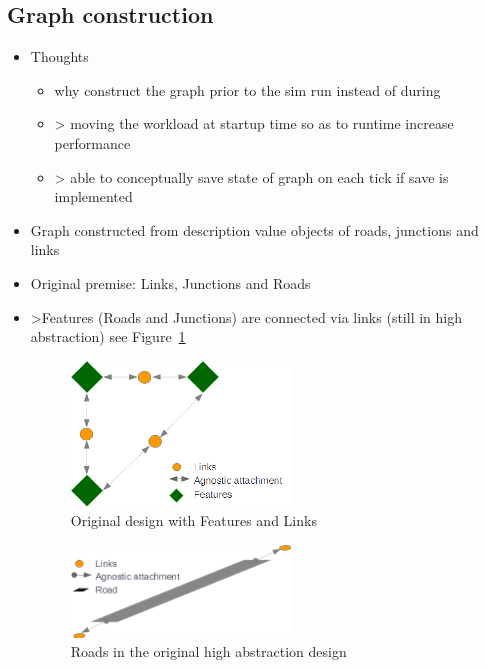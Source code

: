 \subsection{Graph construction}

\begin{itemize}
	\item Thoughts
	\begin{itemize}
		\item why construct the graph prior to the sim run instead of during	
		\item > moving the workload at startup time so as to runtime increase performance
		\item > able to conceptually save state of graph on each tick if save is implemented
	\end{itemize}
	\item Graph constructed from description value objects of roads, junctions and links
	\item Original premise: Links, Junctions and Roads
	\item >Features (Roads and Junctions) are connected via links (still in high abstraction) see Figure~\ref{fig:FeatureConnect}

    \begin{figure}
        \vspace{1.5em}
        \caption{Original design with Features and Links}
        \label{fig:FeatureConnect}
        \centering
        \includegraphics[width=0.55\textwidth]{figs/graphConstruction/OriginalConnections.png}
        \vspace{1.5em}
    \end{figure}

    \begin{figure}
        \vspace{1.5em}
        \caption{Roads in the original high abstraction design}
        \label{fig:RoadsOriginal}
        \centering
        \includegraphics[width=0.55\textwidth]{figs/graphConstruction/OriginalRoads.png}
        \vspace{1.5em}
    \end{figure}


\end{itemize}
